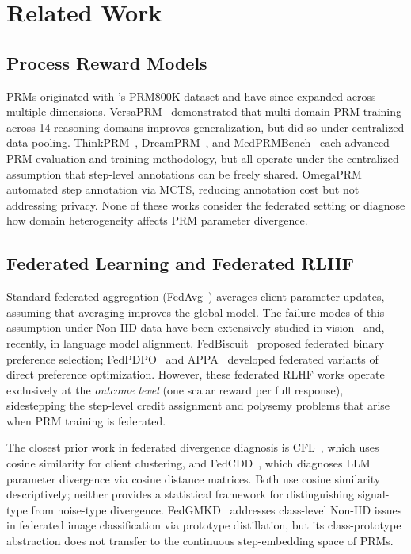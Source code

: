 \documentclass{article}
\begin{document}
\section{Related Work}

\subsection{Process Reward Models}

PRMs originated with \citet{lightman2023lets}'s PRM800K dataset and have since expanded across multiple dimensions.
VersaPRM~\cite{versaprm2025} demonstrated that multi-domain PRM training across 14 reasoning domains improves generalization, but did so under centralized data pooling.
ThinkPRM~\cite{thinkprm2025}, DreamPRM~\cite{dreamprm2025}, and MedPRMBench~\cite{medprmbench2026} each advanced PRM evaluation and training methodology, but all operate under the centralized assumption that step-level annotations can be freely shared.
OmegaPRM~\cite{omegaprm2024} automated step annotation via MCTS, reducing annotation cost but not addressing privacy.
None of these works consider the federated setting or diagnose how domain heterogeneity affects PRM parameter divergence.

\subsection{Federated Learning and Federated RLHF}

Standard federated aggregation (FedAvg~\cite{fedavg2017}) averages client parameter updates, assuming that averaging improves the global model.
The failure modes of this assumption under Non-IID data have been extensively studied in vision~\cite{fedprox2020,scaffold2020,fedgmkd2024} and, recently, in language model alignment.
FedBiscuit~\cite{fedbiscuit2025} proposed federated binary preference selection; FedPDPO~\cite{fedpdpo2026} and APPA~\cite{appa2026} developed federated variants of direct preference optimization.
However, these federated RLHF works operate exclusively at the \emph{outcome level} (one scalar reward per full response), sidestepping the step-level credit assignment and polysemy problems that arise when PRM training is federated.

The closest prior work in federated divergence diagnosis is CFL~\cite{cfl2020}, which uses cosine similarity for client clustering, and FedCDD~\cite{fedcdd2025}, which diagnoses LLM parameter divergence via cosine distance matrices.
Both use cosine similarity descriptively; neither provides a statistical framework for distinguishing signal-type from noise-type divergence.
FedGMKD~\cite{fedgmkd2024} addresses class-level Non-IID issues in federated image classification via prototype distillation, but its class-prototype abstraction does not transfer to the continuous step-embedding space of PRMs.
\end{document}
